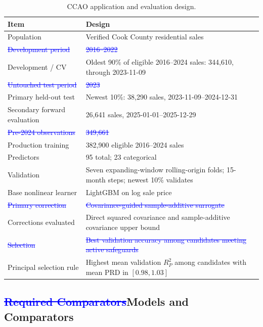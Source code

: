 \documentclass[10pt]{article}
\theoremstyle{definition}
\newcommand{\1}{\mathbf{1}}
\begin{document}
{{\begin{table}[t]
\centering
\caption{CCAO application and evaluation design.}
\label{tab:ccao_design}
\begin{tabular}{ll}
\toprule
Item & Design \\
\midrule
Population & Verified Cook County residential sales \\
\textcolor{blue}{\sout{Development period}} & \textcolor{blue}{\sout{2016--2022}} \\
\textcolor{impGreen}{Development / CV} & \textcolor{impGreen}{Oldest 90\% of eligible 2016--2024 sales: 344,610, through 2023-11-09} \\
\textcolor{blue}{\sout{Untouched test period}} & \textcolor{blue}{\sout{2023}} \\
\textcolor{impGreen}{Primary held-out test} & \textcolor{impGreen}{Newest 10\%: 38,290 sales, 2023-11-09--2024-12-31} \\
\textcolor{impGreen}{Secondary forward evaluation} & \textcolor{impGreen}{26,641 sales, 2025-01-01--2025-12-29} \\
\textcolor{blue}{\sout{Pre-2024 observations}} & \textcolor{blue}{\sout{349,661}} \\
\textcolor{impGreen}{Production training} & \textcolor{impGreen}{382,900 eligible 2016--2024 sales} \\
Predictors & 95 total; 23 categorical \\
Validation & Seven expanding-window rolling-origin folds; 15-month steps; newest 10\% validates \\
Base nonlinear learner & LightGBM on log sale price \\
\textcolor{blue}{\sout{Primary correction}} & \textcolor{blue}{\sout{Covariance-guided sample-additive surrogate}} \\
\textcolor{impGreen}{Corrections evaluated} & \textcolor{impGreen}{Direct squared covariance and sample-additive covariance upper bound} \\
\textcolor{blue}{\sout{Selection}} & \textcolor{blue}{\sout{Best validation accuracy among candidates meeting active safeguards}} \\
\textcolor{impGreen}{Principal selection rule} & \textcolor{impGreen}{Highest mean validation $R^2_P$ among candidates with mean PRD in $[0.98,1.03]$} \\
\bottomrule
\end{tabular}
\end{table}

\subsection{\textcolor{blue}{\sout{Required Comparators}}\textcolor{impGreen}{Models and Comparators}}
\label{subsec:comparators}

}}
\end{document}
